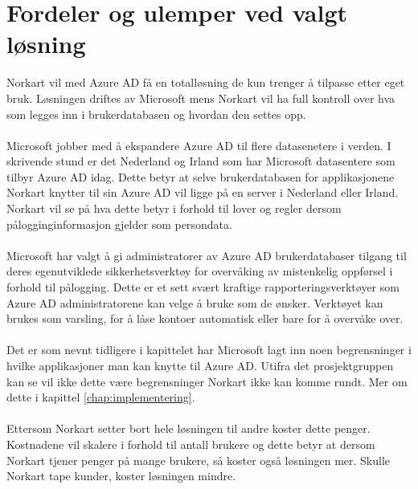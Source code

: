 \section{Fordeler og ulemper ved valgt løsning}
\label{sec:valgAvLosning_fordelerOgUlemper}
Norkart vil med Azure AD få en totalløsning de kun trenger å tilpasse etter eget bruk. Løsningen driftes av Microsoft mens Norkart vil ha full kontroll over hva som legges inn i brukerdatabasen og hvordan den settes opp. 
\\
\\
Microsoft jobber med å ekspandere Azure AD til flere datasenetere i verden. I skrivende stund er det Nederland og Irland som har Microsoft datasentere som tilbyr Azure AD idag. Dette betyr at selve brukerdatabasen for applikasjonene Norkart knytter til sin Azure AD vil ligge på en server i Nederland eller Irland. Norkart vil se på hva dette betyr i forhold til lover og regler dersom pålogginginformasjon gjelder som persondata. 
\\
\\
Microsoft har valgt å gi administratorer av Azure AD brukerdatabaser tilgang til deres egenutviklede sikkerhetsverktøy for overvåking av mistenkelig oppførsel i forhold til pålogging. Dette er et sett svært kraftige rapporteringsverktøyer som Azure AD administratorene kan velge å bruke som de ønsker. Verktøyet kan brukes som varsling, for å låse kontoer automatisk eller bare for å overvåke over.
\\
\\
Det er som nevnt tidligere i kapittelet har Microsoft lagt inn noen begrensninger i hvilke applikasjoner man kan knytte til Azure AD. Utifra det prosjektgruppen kan se vil ikke dette være begrensninger Norkart ikke kan komme rundt. Mer om dette i kapittel \ref{chap:implementering}.
\\
\\
Ettersom Norkart setter bort hele løsningen til andre koster dette penger. Kostnadene vil skalere i forhold til antall brukere og dette betyr at dersom Norkart tjener penger på mange brukere, så koster også løsningen mer. Skulle Norkart tape kunder, koster løsningen mindre.

